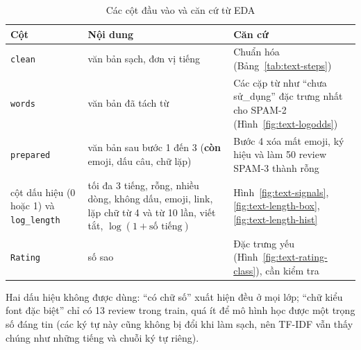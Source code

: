 \begin{table}[H]
\centering
\caption{Các cột đầu vào và căn cứ từ EDA}
\label{tab:text-input-cols}
\small
\begin{tabular}{>{\raggedright\arraybackslash}p{3.4cm}>{\raggedright\arraybackslash}p{4.8cm}>{\raggedright\arraybackslash}p{6.2cm}}
\toprule
Cột & Nội dung & Căn cứ\\
\midrule
\texttt{clean} & văn bản sạch, đơn vị tiếng & Chuẩn hóa (Bảng~\ref{tab:text-steps})\\
\texttt{words} & văn bản đã tách từ & Các cặp từ như ``chưa sử\_dụng'' đặc trưng nhất cho SPAM-2 (Hình~\ref{fig:text-logodds})\\
\texttt{prepared} & văn bản sau bước 1 đến 3 (\textbf{còn} emoji, dấu câu, chữ lặp) & Bước 4 xóa mất emoji, ký hiệu và làm 50 review SPAM-3 thành rỗng\\
9 cột dấu hiệu (0 hoặc 1) và \texttt{log\_length} & tối đa 3 tiếng, rỗng, nhiều dòng, không dấu, emoji, link, lặp chữ từ 4 và từ 10 lần, viết tắt, $\log(1+\text{số tiếng})$ & Hình~\ref{fig:text-signals}, \ref{fig:text-length-box}, \ref{fig:text-length-hist}\\
\texttt{Rating} & số sao & Đặc trưng yếu (Hình~\ref{fig:text-rating-class}), cần kiểm tra\\
\bottomrule
\end{tabular}
\end{table}

Hai dấu hiệu không được dùng: ``có chữ số'' xuất hiện đều ở mọi lớp; ``chữ kiểu font đặc biệt'' chỉ có 13 review trong train, quá ít để mô hình
học được một trọng số đáng tin (các ký tự này cũng không bị đổi khi làm sạch, nên TF-IDF vẫn thấy chúng như những tiếng và chuỗi ký tự riêng).


